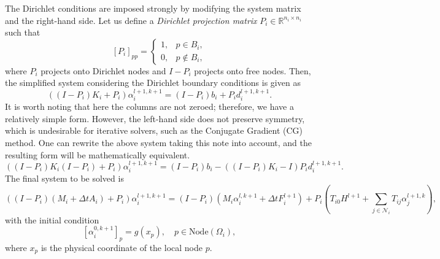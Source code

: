 \documentclass[a4paper, 11pt]{article}
\theoremstyle{plain}
\theoremstyle{definition}
\theoremstyle{remark}
\begin{document}
The Dirichlet conditions are imposed strongly by modifying the system matrix and the right-hand side. Let us define a \textit{Dirichlet projection matrix} $P_{i}\in \mathbb{R}^{n_{i}\times n_{i}}$ such that
\begin{equation*}
    \left[P_{i}\right]_{pp} = 
    \begin{cases}
        1, & p\in B_{i},\\
        0, & p\notin B_{i},
    \end{cases}
\end{equation*}
where $P_{i}$ projects onto Dirichlet nodes and $I - P_{i}$ projects onto free nodes. Then, the simplified system considering the Dirichlet boundary conditions is given as
\begin{equation*}
    \left(\left(I - P_{i}\right)K_{i} + P_{i}\right)\alpha_{i}^{l+1, k+1} = \left(I - P_{i}\right)b_{i} + P_{i}d^{l+1, k+1}_{i}.
\end{equation*}
It is worth noting that here the columns are not zeroed; therefore, we have a relatively simple form. However, the left-hand side does not preserve symmetry, which is undesirable for iterative solvers, such as the Conjugate Gradient (CG) method. One can rewrite the above system taking this note into account, and the resulting form will be mathematically equivalent.
\begin{equation*}
    \left(\left(I - P_{i}\right)K_{i}\left(I - P_{i}\right) + P_{i}\right)\alpha_{i}^{l+1, k+1} = \left(I - P_{i}\right)b_{i} - \left((I - P_{i})K_{i} - I\right)P_{i}d^{l+1, k+1}_{i}.
\end{equation*}
The final system to be solved is 
\begin{equation*}
    \left(\left(I - P_{i}\right)\left(M_{i} + \Delta t A_{i}\right) + P_{i}\right)\alpha_{i}^{l+1, k+1} = \left(I - P_{i}\right)\left(M_{i} \alpha_{i}^{l, k+1} + \Delta tF_{i}^{l+1}\right) + P_{i}\left(T_{i0}H^{l+1} + \sum_{j\in\mathcal{N}_{i}}T_{ij}\alpha^{l+1, k}_{j}\right),
\end{equation*}
with the initial condition
\begin{equation*}
    \left[\alpha_{i}^{0, k + 1}\right]_{p} = g(x_{p}), \quad p\in \text{Node}(\Omega_{i}),
\end{equation*}
where $x_p$ is the physical coordinate of the local node $p$. \vspace{10pt}
\end{document}
